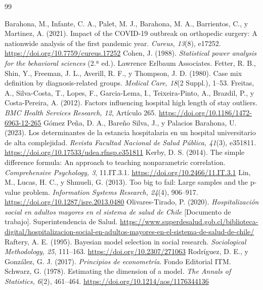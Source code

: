 \documentclass[10.5pt,a4paper,headings=small,abstract=false,bibliography=totoc,listof=totoc]{scrartcl}
\begin{document}
\clearpage
\begin{thebibliography}{99}\small\raggedright\setlength{\itemsep}{0.25em}
 Barahona, M., Infante, C. A., Palet, M. J., Barahona, M. A., Barrientos, C., y Martinez, A. (2021). Impact of the COVID-19 outbreak on orthopedic surgery: A nationwide analysis of the first pandemic year. \emph{Cureus, 13}(8), e17252. \url{https://doi.org/10.7759/cureus.17252}
 Cohen, J. (1988). \emph{Statistical power analysis for the behavioral sciences} (2.ª ed.). Lawrence Erlbaum Associates.
 Fetter, R. B., Shin, Y., Freeman, J. L., Averill, R. F., y Thompson, J. D. (1980). Case mix definition by diagnosis-related groups. \emph{Medical Care, 18}(2 Suppl.), 1--53.
 Freitas, A., Silva-Costa, T., Lopes, F., Garcia-Lema, I., Teixeira-Pinto, A., Brazdil, P., y Costa-Pereira, A. (2012). Factors influencing hospital high length of stay outliers. \emph{BMC Health Services Research, 12}, Artículo 265. \url{https://doi.org/10.1186/1472-6963-12-265}
 Gómez Peña, D. A., Bareño Silva, J., y Palacios Barahona, U. (2023). Los determinantes de la estancia hospitalaria en un hospital universitario de alta complejidad. \emph{Revista Facultad Nacional de Salud Pública, 41}(3), e351811. \url{https://doi.org/10.17533/udea.rfnsp.e351811}
 Kerby, D. S. (2014). The simple difference formula: An approach to teaching nonparametric correlation. \emph{Comprehensive Psychology, 3}, 11.IT.3.1. \url{https://doi.org/10.2466/11.IT.3.1}
 Lin, M., Lucas, H. C., y Shmueli, G. (2013). Too big to fail: Large samples and the p-value problem. \emph{Information Systems Research, 24}(4), 906--917. \url{https://doi.org/10.1287/isre.2013.0480}
 Olivares-Tirado, P. (2020). \emph{Hospitalización social en adultos mayores en el sistema de salud de Chile} [Documento de trabajo]. Superintendencia de Salud. \url{https://www.superdesalud.gob.cl/biblioteca-digital/hospitalizacion-social-en-adultos-mayores-en-el-sistema-de-salud-de-chile/}
 Raftery, A. E. (1995). Bayesian model selection in social research. \emph{Sociological Methodology, 25}, 111--163. \url{https://doi.org/10.2307/271063}
 Rodríguez, D. E., y González, G. J. (2017). \emph{Principios de econometría}. Fondo Editorial ITM.
 Schwarz, G. (1978). Estimating the dimension of a model. \emph{The Annals of Statistics, 6}(2), 461--464. \url{https://doi.org/10.1214/aos/1176344136}
\end{thebibliography}
\end{document}
